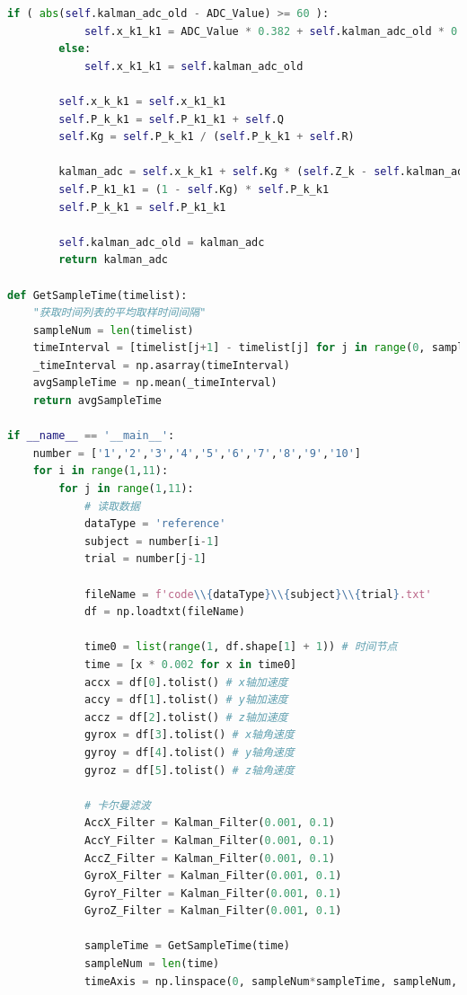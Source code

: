 \documentclass[withoutpreface]{cumcmthesis}
\begin{document}
\begin{appendices}
\begin{lstlisting}[language=python]
        if ( abs(self.kalman_adc_old - ADC_Value) >= 60 ):
            self.x_k1_k1 = ADC_Value * 0.382 + self.kalman_adc_old * 0.618
        else:
            self.x_k1_k1 = self.kalman_adc_old

        self.x_k_k1 = self.x_k1_k1
        self.P_k_k1 = self.P_k1_k1 + self.Q
        self.Kg = self.P_k_k1 / (self.P_k_k1 + self.R)

        kalman_adc = self.x_k_k1 + self.Kg * (self.Z_k - self.kalman_adc_old)
        self.P_k1_k1 = (1 - self.Kg) * self.P_k_k1
        self.P_k_k1 = self.P_k1_k1

        self.kalman_adc_old = kalman_adc
        return kalman_adc

def GetSampleTime(timelist):
    "获取时间列表的平均取样时间间隔"
    sampleNum = len(timelist)
    timeInterval = [timelist[j+1] - timelist[j] for j in range(0, sampleNum-1)]
    _timeInterval = np.asarray(timeInterval)
    avgSampleTime = np.mean(_timeInterval)
    return avgSampleTime

if __name__ == '__main__':
    number = ['1','2','3','4','5','6','7','8','9','10']
    for i in range(1,11):
        for j in range(1,11):
            # 读取数据
            dataType = 'reference'
            subject = number[i-1]
            trial = number[j-1]

            fileName = f'code\\{dataType}\\{subject}\\{trial}.txt'
            df = np.loadtxt(fileName)
            
            time0 = list(range(1, df.shape[1] + 1)) # 时间节点
            time = [x * 0.002 for x in time0]
            accx = df[0].tolist() # x轴加速度
            accy = df[1].tolist() # y轴加速度
            accz = df[2].tolist() # z轴加速度
            gyrox = df[3].tolist() # x轴角速度
            gyroy = df[4].tolist() # y轴角速度
            gyroz = df[5].tolist() # z轴角速度
            
            # 卡尔曼滤波
            AccX_Filter = Kalman_Filter(0.001, 0.1)
            AccY_Filter = Kalman_Filter(0.001, 0.1)
            AccZ_Filter = Kalman_Filter(0.001, 0.1)
            GyroX_Filter = Kalman_Filter(0.001, 0.1)
            GyroY_Filter = Kalman_Filter(0.001, 0.1)
            GyroZ_Filter = Kalman_Filter(0.001, 0.1)

            sampleTime = GetSampleTime(time)
            sampleNum = len(time)
            timeAxis = np.linspace(0, sampleNum*sampleTime, sampleNum, True)


\end{lstlisting}
\end{appendices}
\end{document}
